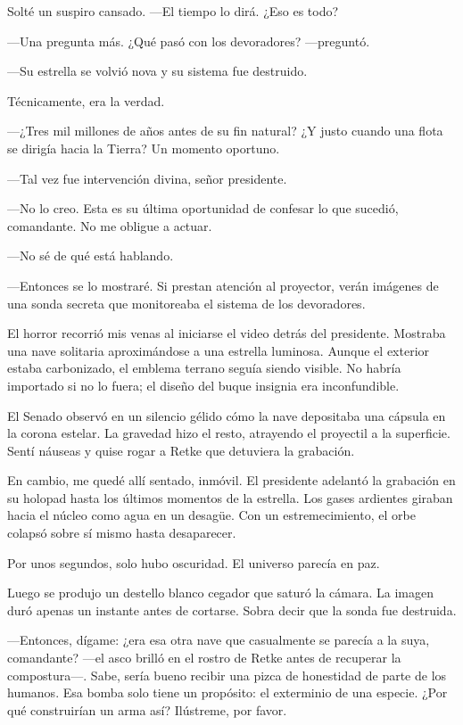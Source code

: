 Solté un suspiro cansado. —El tiempo lo dirá. ¿Eso es todo?

—Una pregunta más. ¿Qué pasó con los devoradores? —preguntó.

—Su estrella se volvió nova y su sistema fue destruido.

Técnicamente, era la verdad.

 —¿Tres mil millones de años antes de su fin natural? ¿Y justo cuando una flota se dirigía hacia la Tierra? Un momento oportuno.

—Tal vez fue intervención divina, señor presidente.

—No lo creo. Esta es su última oportunidad de confesar lo que sucedió, comandante. No me obligue a actuar.

—No sé de qué está hablando.

—Entonces se lo mostraré. Si prestan atención al proyector, verán imágenes de una sonda secreta que monitoreaba el sistema de los devoradores.

El horror recorrió mis venas al iniciarse el video detrás del presidente. Mostraba una nave solitaria aproximándose a una estrella luminosa. Aunque el exterior estaba carbonizado, el emblema terrano seguía siendo visible. No habría importado si no lo fuera; el diseño del buque insignia era inconfundible.

El Senado observó en un silencio gélido cómo la nave depositaba una cápsula en la corona estelar. La gravedad hizo el resto, atrayendo el proyectil a la superficie. Sentí náuseas y quise rogar a Retke que detuviera la grabación.

En cambio, me quedé allí sentado, inmóvil. El presidente adelantó la grabación en su holopad hasta los últimos momentos de la estrella. Los gases ardientes giraban hacia el núcleo como agua en un desagüe. Con un estremecimiento, el orbe colapsó sobre sí mismo hasta desaparecer.

Por unos segundos, solo hubo oscuridad. El universo parecía en paz.

Luego se produjo un destello blanco cegador que saturó la cámara. La imagen duró apenas un instante antes de cortarse. Sobra decir que la sonda fue destruida.

—Entonces, dígame: ¿era esa otra nave que casualmente se parecía a la suya, comandante? —el asco brilló en el rostro de Retke antes de recuperar la compostura—. Sabe, sería bueno recibir una pizca de honestidad de parte de los humanos. Esa bomba solo tiene un propósito: el exterminio de una especie. ¿Por qué construirían un arma así? Ilústreme, por favor.

